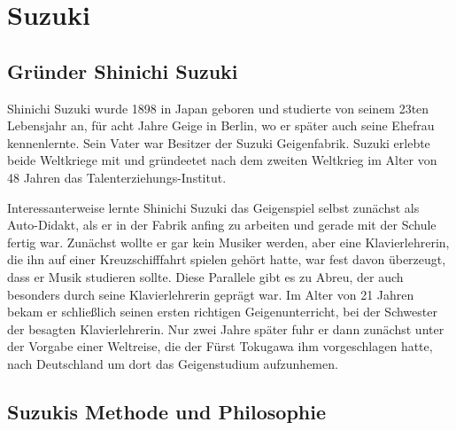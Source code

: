 \section{Suzuki}

\subsection{Gründer Shinichi Suzuki}
Shinichi Suzuki wurde 1898 in Japan geboren und studierte von seinem 23ten
Lebensjahr an, für acht Jahre Geige in Berlin, wo er später auch seine Ehefrau
kennenlernte. Sein Vater war Besitzer der Suzuki Geigenfabrik. Suzuki erlebte
beide Weltkriege mit und gründeetet nach dem zweiten Weltkrieg im Alter
von 48 Jahren das Talenterziehungs-Institut. 

Interessanterweise lernte Shinichi Suzuki das Geigenspiel selbst zunächst als Auto-Didakt, als er
in der Fabrik anfing zu arbeiten und gerade mit der Schule fertig war. Zunächst
wollte er gar kein Musiker werden, aber eine Klavierlehrerin, die ihn auf einer
Kreuzschifffahrt spielen gehört hatte, war fest davon überzeugt, dass er Musik
studieren sollte. \autocite[89]{suzuki:erziehung_ist_liebe} Diese Parallele gibt
es zu Abreu, der auch besonders durch seine Klavierlehrerin geprägt war. Im Alter von 21
Jahren bekam er schließlich seinen ersten richtigen Geigenunterricht, bei der
Schwester der besagten Klavierlehrerin. Nur zwei Jahre später fuhr er dann
zunächst unter der Vorgabe einer Weltreise, die der Fürst Tokugawa ihm
vorgeschlagen hatte, nach Deutschland um dort das Geigenstudium aufzunhemen.
\autocite[90ff]{suzuki:erziehung_ist_liebe}

\subsection{Suzukis Methode und Philosophie}

